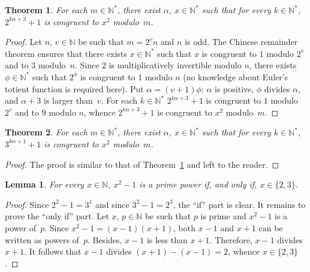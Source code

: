 \documentclass[12pt]{article}
\newcommand{\bZ}{\mathbb{Z}}
\newcommand{\bN}{\mathbb{N}} %
\newcommand{\bNast}{\bN^*}
\newtheorem{theorem}{Theorem}
\newtheorem{lemma}{Lemma}
\theoremstyle{definition}
\begin{document}
   \begin{theorem} \label{thm:pow-2-square-mod}
     For each $m \in \bNast$,
     there exist $\alpha$, $x \in \bNast$ such that for every  $k \in \bNast$, 
     $2^{k \alpha + 3} + 1$ is congruent to $x^2$  modulo~$m$.
   \end{theorem}

   \begin{proof}
     Let $n$, $v \in \bN$ be such that $m = 2^v n$ and $n$ is odd.
     The Chinese remainder theorem ensures that there exists $x \in \bNast$ such that
     $x$ is congruent to $1$ modulo $2^v$ and to $3$ modulo~$n$.
     Since $2$ is multiplicatively invertible modulo $n$,
     there exists $\phi \in \bNast$ such that $2^\phi$ is congruent to $1$ modulo $n$
     (no knowledge about Euler's totient function is required here).
     Put $\alpha = (v + 1) \phi$:
     $\alpha$ is positive,
     $\phi$ divides $\alpha$, and
     $\alpha + 3$ is larger than~$v$.
     For each $k \in \bNast$
     $2^{k \alpha + 3} + 1$ is congruent
     to $1$ modulo $2^v$ and
     to $9$ modulo $n$,
     whence $2^{k \alpha + 3} + 1$ is congruent to $x^2$ modulo~$m$.
   \end{proof}
     
   \begin{theorem}
     For each $m \in \bNast$,
     there exist $\alpha$, $x \in \bNast$ such that for every $k \in \bNast$, 
     $3^{k \alpha + 1} + 1$ is congruent to $x^2$ modulo~$m$.
   \end{theorem}

   \begin{proof}
     The proof is similar to that of Theorem~\ref{thm:pow-2-square-mod} and left to the reader.
    \end{proof} 


     \begin{lemma} \label{lem:x2=q+1}
       For every $x \in \bN$, $x^2 - 1$ is a prime power if, and only if, $x \in \{ 2, 3 \}$. 
     \end{lemma}

     \begin{proof}
       Since  $2^2 - 1 = 3^1$ and since $3^2 - 1 = 2^3$, the ``if'' part is clear.
       It remains to prove the ``only if'' part.
       Let $x$, $p \in \bN$ be such that $p$ is prime and $x^2 - 1$ is a power of~$p$.
       Since  $x^2 - 1 = (x - 1)(x + 1)$, 
       both $x - 1$ and $x + 1$ can be written as powers of~$p$.
       Besides, $x - 1$ is less than $x + 1$.
       Therefore, $x - 1$ divides $x + 1$.
       It follows that $x - 1$ divides $(x + 1) - (x - 1) = 2$,
       whence $x \in \{ 2, 3 \}$.
    \end{proof} 
    
\end{document}
